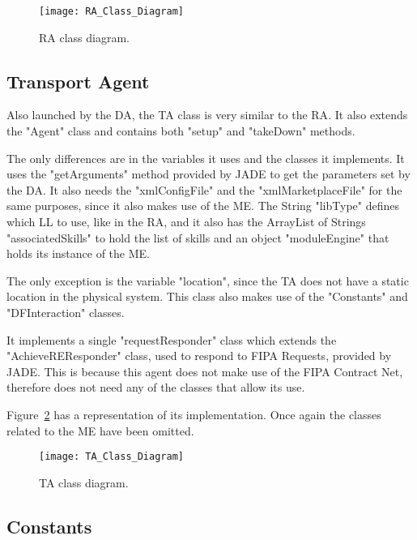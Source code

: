 \begin{figure}[h!]
	\centering
	\texttt{[image: RA\_Class\_Diagram]}
	\caption{\acrlong{RA} class diagram.}
	\label{fig:ra_class_diagram}
\end{figure}

\subsection{Transport Agent}
\label{subsec:transport_agent}

Also launched by the \acrshort{DA}, the \acrlong{TA} class is very similar to the \acrlong{RA}. It also extends the "Agent" class and contains both "setup" and "takeDown" methods.

The only differences are in the variables it uses and the classes it implements. It uses the "getArguments" method provided by \acrshort{JADE} to get the parameters set by the \acrshort{DA}. It also needs the "xmlConfigFile" and the "xmlMarketplaceFile" for the same purposes, since it also makes use of the \acrshort{ME}. The String "libType" defines which \acrshort{LL} to use, like in the \acrshort{RA}, and it also has the ArrayList of Strings "associatedSkills" to hold the list of skills and an object "moduleEngine" that holds its instance of the \acrshort{ME}.

The only exception is the variable "location", since the \acrlong{TA} does not have a static location in the physical system. This class also makes use of the "Constants" and "DFInteraction" classes.

It implements a single "requestResponder" class which extends the "AchieveREResponder" class, used to respond to \acrshort{FIPA} Requests, provided by \acrshort{JADE}. This is because this agent does not make use of the \acrshort{FIPA} Contract Net, therefore does not need any of the classes that allow its use.

Figure~\ref{fig:ta_class_diagram} has a representation of its implementation. Once again the classes related to the \acrshort{ME} have been omitted.\\

\begin{figure}[h!]
	\centering
	\texttt{[image: TA\_Class\_Diagram]}
	\caption{\acrlong{TA} class diagram.}
	\label{fig:ta_class_diagram}
\end{figure}

\subsection{Constants}
\label{subsec:constants}

